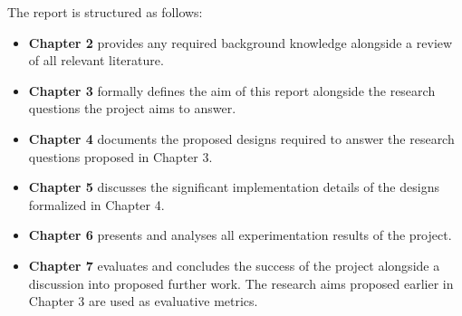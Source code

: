 \newpage
The report is structured as follows:

\begin{itemize}
    \item \textbf{Chapter 2} provides any required background knowledge alongside a review of all relevant literature.

    \item \textbf{Chapter 3} formally defines the aim of this report alongside the research questions the project aims to answer.

    \item \textbf{Chapter 4} documents the proposed designs required to answer the research questions proposed in Chapter 3.

    \item \textbf{Chapter 5} discusses the significant implementation details of the designs formalized in Chapter 4.

    \item \textbf{Chapter 6} presents and analyses all experimentation results of the project.

    \item \textbf{Chapter 7} evaluates and concludes the success of the project alongside a discussion into proposed further work. The research aims proposed earlier in Chapter 3 are used as evaluative metrics.
\end{itemize}